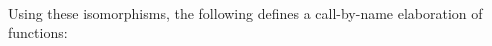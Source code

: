 \begin{code}%
\>[6][@{}l@{\AgdaIndent{1}}]%
\>[8]%
\>[15]\AgdaSymbol{:}%
\>[18]\AgdaSymbol{\{}\AgdaSpace{}%
\AgdaSpace{}%
\AgdaSymbol{:}\AgdaSpace{}%
\AgdaSymbol{\}}%
\>[34]\AgdaSpace{}%
\AgdaSpace{}%
\AgdaSpace{}%
\AgdaSpace{}%
\AgdaSpace{}%
%
\>[50]%
\>[53]\AgdaSymbol{(}\AgdaSpace{}%
\AgdaSpace{}%
\AgdaSpace{}%
\AgdaSpace{}%
\AgdaSpace{}%
\AgdaSpace{}%
\AgdaSpace{}%
\AgdaSpace{}%
\AgdaSymbol{)}\<%
\\
%
\>[8]%
\>[15]\AgdaSymbol{:}%
\>[18]\AgdaSymbol{\{}\AgdaSpace{}%
\AgdaSymbol{:}\AgdaSpace{}%
\AgdaSymbol{\}}%
\>[34]\AgdaSpace{}%
\AgdaSpace{}%
\AgdaSpace{}%
\AgdaSpace{}%
%
\>[50]%
\>[53]\AgdaSpace{}%
\AgdaSpace{}%
\AgdaSpace{}%
\AgdaSpace{}%
\<%
\end{code}
Using these isomorphisms, the following defines a call-by-name elaboration of functions:
